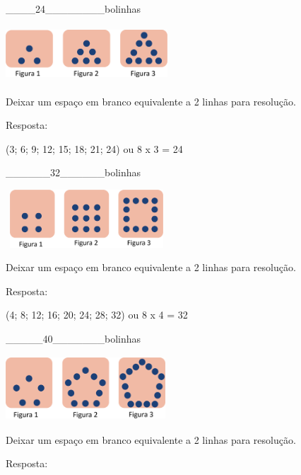 \begin{escolha}
\begin{escolha}

\item
  \_\_\_\_24\_\_\_\_\_\_\_\_bolinhas
\end{escolha}

\includegraphics[width=2.38354in,height=0.81674in]{media/image33.png}

Deixar um espaço em branco equivalente a 2 linhas para resolução.

Resposta:

(3; 6; 9; 12; 15; 18; 21; 24) ou 8 x 3 = 24

\begin{escolha}

\item
  \_\_\_\_\_\_32\_\_\_\_\_\_bolinhas
\end{escolha}

\includegraphics[width=2.38354in,height=0.85007in]{media/image34.png}

Deixar um espaço em branco equivalente a 2 linhas para resolução.

Resposta:

(4; 8; 12; 16; 20; 24; 28; 32) ou 8 x 4 = 32

\begin{escolha}

\item
  \_\_\_\_\_40\_\_\_\_\_\_\_bolinhas
\end{escolha}

\includegraphics[width=2.35854in,height=0.94175in]{media/image35.png}

Deixar um espaço em branco equivalente a 2 linhas para resolução.

Resposta:


\end{escolha}
